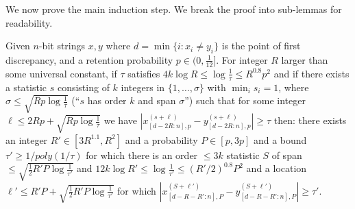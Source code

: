 \documentclass[11pt]{article}
\theoremstyle{plain}
\begin{document}
We now prove the main induction step. We break the proof into sub-lemmas for readability.

\begin{proposition}\label{prop:induction}
Given $n$-bit strings $x,y$ where $d=\min\{i:x_i\neq y_i\}$ is the point of first discrepancy, and a retention probability $p\in(0,\frac{1}{12}]$. For integer $R$ larger than some universal constant, if $\tau$ satisfies $4k\log R\leq \log\frac{1}{\tau}\leq R^{0.8}p^2$ and if there exists a statistic $s$ consisting of $k$ integers in $\{1,\ldots,\sigma\}$ with $\min_i s_i=1$, where $\sigma\leq  \sqrt{Rp\log\frac{1}{\tau}}$  
(``$s$ has order $k$ and span $\sigma$'') such that for some integer $\ell\leq 2Rp+ \sqrt{R p\log\frac{1}{\tau}}$ we have $|x_{[d-2R:n],p}^{(s+\ell)}-y_{[d-2R:n],p}^{(s+\ell)}|\geq \tau$ then: there exists an integer $R'\in[3R^{1.1},R^{2}]$ and a probability $P\in [p,3p]$ and a bound $\tau'\geq 1/poly(1/\tau)$ for which there is an order $\leq 3k$ statistic $S$ of span $\leq  \sqrt{\frac{1}{2}R'P\log\frac{1}{\tau'}}$ and $12k\log R'\leq \log\frac{1}{\tau'}\leq ({R'}/2)^{0.8}P^2$ and a location $\ell'\leq R'P+ \sqrt{\frac{1}{2}R' P\log\frac{1}{\tau'}}$ for which $|x_{[d-R-R':n],P}^{(S+\ell')}-y_{[d-R-R':n],P}^{(S+\ell')}|\geq \tau'$.
\end{proposition}
\end{document}
